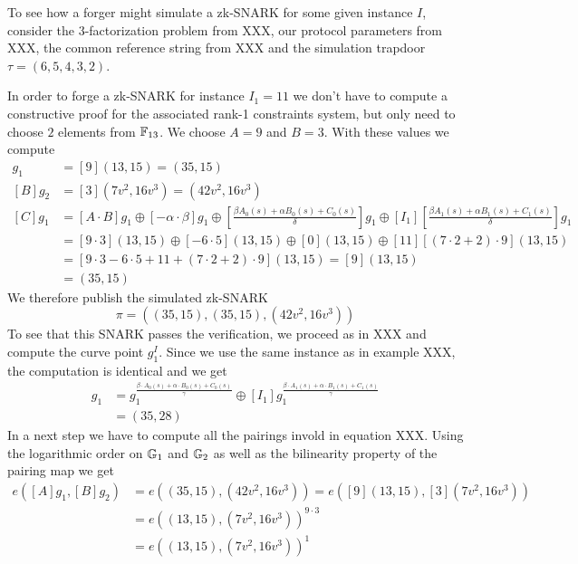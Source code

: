 \begin{example} To see how a forger might simulate a  
zk-SNARK for some given instance $I$, consider the $3$-factorization problem from XXX, our protocol parameters from XXX, the common reference string from XXX and the simulation trapdoor $\tau = (6,5,4,3,2)$.

In order to forge a zk-SNARK for instance $I_1=11$ we don't have to compute a constructive proof for the associated rank-1 constraints system, but only need to choose $2$ elements from $\mathbb{F}_{13}$. We choose $A=9$ and $B=3$. With these values we compute
\begin{align*}
[A]g_1 & = [9](13,15) = (35,15)\\
[B]g_2 & = [3](7v^2,16v^3) = (42v^2,16v^3)\\
[C]g_1 & = [A\cdot B]g_1\oplus [-\alpha\cdot\beta]g_1\oplus 
      [\frac{\beta A_0(s) + \alpha B_0(s)+ C_0(s)}{\delta}]g_1\oplus 
      [I_1][\frac{\beta A_1(s) + \alpha B_1(s)+ C_1(s)}{\delta}]g_1\\
      & = [9\cdot 3](13,15)\oplus [-6\cdot5](13,15)\oplus 
      [0](13,15)\oplus [11][(7\cdot 2 + 2)\cdot 9](13,15)\\
      & = [9\cdot 3 -6\cdot 5 + 11+ (7\cdot 2 + 2)\cdot 9](13,15)=[9](13,15)\\
      & = (35,15)
\end{align*}
We therefore publish the simulated zk-SNARK
$$
\pi=((35,15),(35,15),(42v^2,16v^3))
$$
To see that this SNARK passes the verification, we proceed as in XXX and compute 
the curve point $g_1^I$. Since we use the same instance as in example XXX, the computation is identical and we get
\begin{align*}
[I]g_1 & = g_1^{\frac{\beta\cdot A_{0}(s)+\alpha\cdot B_{0}(s)+C_{0}(s)}{\gamma}} \oplus [I_1]g_1^{\frac{\beta\cdot A_{1}(s)+\alpha\cdot B_{1}(s)+C_{1}(s)}{\gamma}}\\
       & =  (35,28)
\end{align*} 
In a next step we have to compute all the pairings invold in equation XXX. Using the logarithmic order on $\mathbb{G}_1$ and $\mathbb{G}_2$ as well as the bilinearity property of the pairing map we get
\begin{align*}
e([A]g_1,[B]g_2) & = e((35,15),(42v^2,16v^3))
                   = e([9](13,15),[3](7v^2,16v^3))\\
               & = e((13,15),(7v^2,16v^3))^{9\cdot 3}\\ 
               & = e((13,15),(7v^2,16v^3))^{1}\\

\end{align*}
\end{example}
